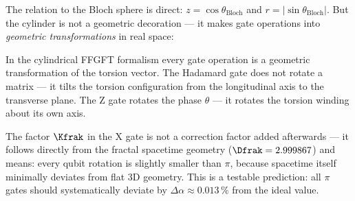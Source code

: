 The relation to the Bloch sphere is direct:
$z = \cos\theta_\text{Bloch}$ and $r = |\sin\theta_\text{Bloch}|$.
But the cylinder is not a geometric decoration ---
it makes gate operations into \emph{geometric
transformations} in real space:

\begin{center}
\end{center}

\begin{foundation}
In the cylindrical FFGFT formalism every gate operation
is a geometric transformation of the torsion vector.
The Hadamard gate does not rotate a matrix ---
it tilts the torsion configuration from the
longitudinal axis to the transverse plane.
The Z gate rotates the phase $\theta$ ---
it rotates the torsion winding about its own axis.

The factor $\Kfrak$ in the X gate is not
a correction factor added afterwards ---
it follows directly from the fractal spacetime geometry
($\Dfrak = 2.999867$) and means:
every qubit rotation is slightly smaller than $\pi$,
because spacetime itself minimally deviates from flat
3D geometry.
This is a testable prediction:
all $\pi$ gates should systematically deviate by
$\Delta\alpha \approx 0.013\,\%$ from the ideal value.
\end{foundation}

